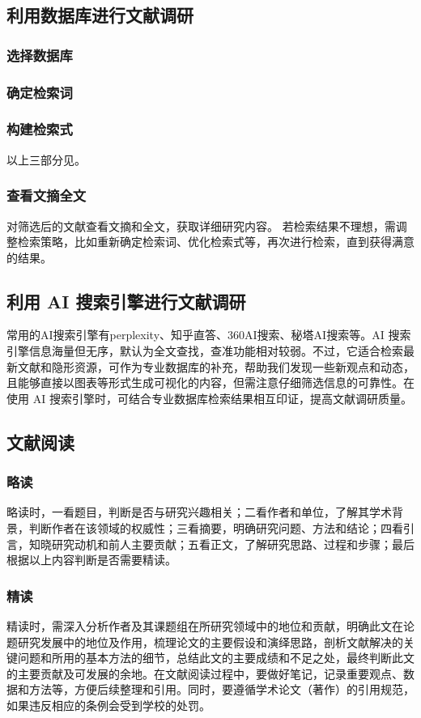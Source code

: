 \documentclass{amznotes}
\begin{document}
\subsection{利用数据库进行文献调研}
\subsubsection{选择数据库}
\subsubsection{确定检索词}
\subsubsection{构建检索式}
以上三部分见。
\subsubsection{查看文摘全文}
对筛选后的文献查看文摘和全文，获取详细研究内容。
若检索结果不理想，需调整检索策略，比如重新确定检索词、优化检索式等，再次进行检索，直到获得满意的结果。
\subsection{利用 AI 搜索引擎进行文献调研}
常用的AI搜索引擎有perplexity、知乎直答、360AI搜索、秘塔AI搜索等。AI 搜索引擎信息海量但无序，默认为全文查找，查准功能相对较弱。不过，它适合检索最新文献和隐形资源，可作为专业数据库的补充，帮助我们发现一些新观点和动态，且能够直接以图表等形式生成可视化的内容，但需注意仔细筛选信息的可靠性。在使用 AI 搜索引擎时，可结合专业数据库检索结果相互印证，提高文献调研质量。
\subsection*{文献阅读}
\subsubsection{略读}
略读时，一看题目，判断是否与研究兴趣相关；二看作者和单位，了解其学术背景，判断作者在该领域的权威性；三看摘要，明确研究问题、方法和结论；四看引言，知晓研究动机和前人主要贡献；五看正文，了解研究思路、过程和步骤；最后根据以上内容判断是否需要精读。
\subsubsection{精读}
精读时，需深入分析作者及其课题组在所研究领域中的地位和贡献，明确此文在论题研究发展中的地位及作用，梳理论文的主要假设和演绎思路，剖析文献解决的关键问题和所用的基本方法的细节，总结此文的主要成绩和不足之处，最终判断此文的主要贡献及可发展的余地。在文献阅读过程中，要做好笔记，记录重要观点、数据和方法等，方便后续整理和引用。同时，要遵循学术论文（著作）的引用规范，如果违反相应的条例会受到学校的处罚。
\end{document}
